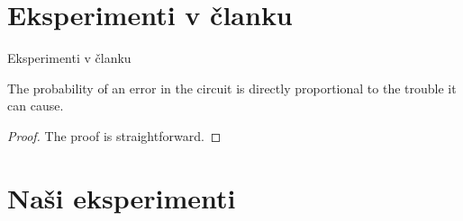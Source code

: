 \documentclass[xcolor=dvipsnames,compress]{beamer}
\begin{document}
\section{Eksperimenti v članku}
\label{sec:eksoni}

\begin{frame}{Eksperimenti v članku}
\begin{theorem}
  The probability of an error in the circuit is directly proportional
      to the trouble it can cause.
\end{theorem}
\pause
\begin{proof}
 The proof is straightforward.
\end{proof}
\end{frame}

\section{Naši eksperimenti}
\label{sec:eksmi}
\end{document}

